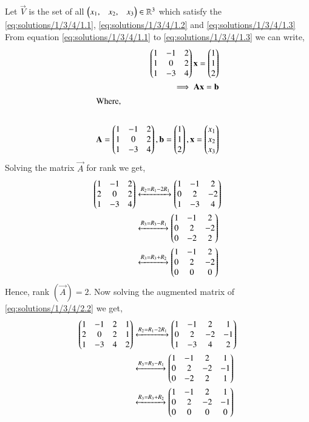 Let $\vec{V}$ is the set of all  $\begin{pmatrix}x_1, & x_2, & x_3 \end{pmatrix}\in \mathbb{R}^{3} $ which satisfy the \eqref{eq:solutions/1/3/4/1.1}, \eqref{eq:solutions/1/3/4/1.2} and \eqref{eq:solutions/1/3/4/1.3}\\
From equation \eqref{eq:solutions/1/3/4/1.1} to \eqref{eq:solutions/1/3/4/1.3} we can write,
\begin{align}
\begin{pmatrix}1 & -1 & 2 \\ 1 & 0 & 2 \\ 1 & -3 & 4\end{pmatrix}\mathbf{x}= \begin{pmatrix}1 \\ 1 \\ 2\end{pmatrix}\\
\implies \mathbf{A}\mathbf{x} = \mathbf{b}  \label{eq:solutions/1/3/4/2.2}\\
\intertext{Where,}\\
\mathbf{A} = \begin{pmatrix}1 & -1 & 2 \\ 1 & 0 & 2 \\ 1 & -3 & 4\end{pmatrix}, \mathbf{b}= \begin{pmatrix}1 \\ 1 \\ 2\end{pmatrix}, \mathbf{x} = \begin{pmatrix}x_1 \\ x_2 \\ x_3\end{pmatrix} \label{eq:solutions/1/3/4/2.4}
\end{align}
Solving the  matrix $\vec{A}$ for rank  we get,
\begin{align}
\begin{pmatrix}1&-1& 2\\ 2& 0 & 2 \\ 1 & -3 & 4\end{pmatrix} &\xleftrightarrow{R_2=R_1 - 2R_1}\begin{pmatrix}1&-1&2 \\ 0 &2 & -2 \\ 1 &-3 & 4\end{pmatrix}\\
&\xleftrightarrow{R_3=R_3 -R_1}\begin{pmatrix}1 &-1&2 \\0 &2 &-2 \\ 0 & -2 & 2\end{pmatrix}\\
&\xleftrightarrow{R_3=R_3 + R_2}\begin{pmatrix}1 &-1&2 \\0 &2 &-2 \\ 0 & 0 & 0\end{pmatrix}
\end{align}
Hence, rank $\left(  \vec{A}  \right) = 2. $
Now solving the augmented matrix of \eqref{eq:solutions/1/3/4/2.2} we get,
\begin{align}
\begin{pmatrix}1&-1& 2 & 1 \\ 2& 0 & 2 & 1 \\ 1 & -3 & 4 & 2 \end{pmatrix} &\xleftrightarrow{R_2=R_1 - 2R_1}\begin{pmatrix}1&-1&2 & 1  \\ 0 &2 & -2 & -1 \\ 1 &-3 & 4 & 2\end{pmatrix}\\
&\xleftrightarrow{R_3=R_3 -R_1}\begin{pmatrix}1 &-1&2 & 1\\0 &2 &-2 &-1 \\ 0 & -2 & 2 & 1\end{pmatrix} \\
&\xleftrightarrow{R_3=R_3 + R_2}\begin{pmatrix}1 &-1&2 & 1 \\0 &2 &-2 & -1 \\ 0 & 0 & 0 & 0\end{pmatrix}
\end{align}
